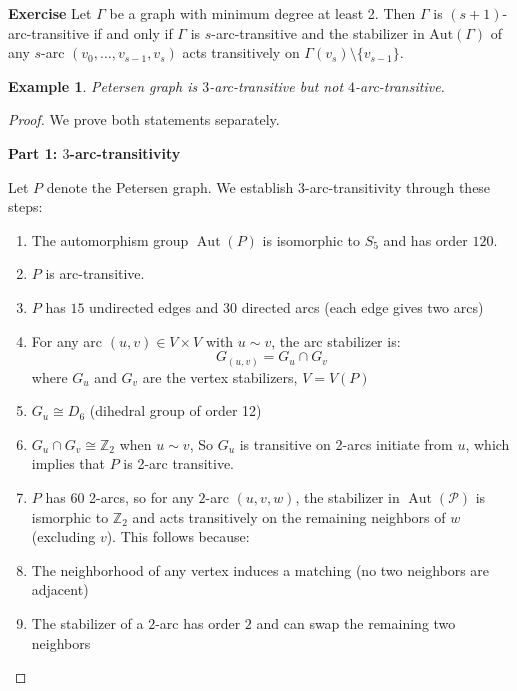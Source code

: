 \documentclass[12pt,a4paper,openany]{book}
\newtheorem{example}{Example}[section]
\begin{document}
\bigskip\noindent\textbf{Exercise}
    Let $\Gamma$ be a graph with minimum degree at least 2. Then $\Gamma$ is $(s + 1)$-arc-transitive if and only if $\Gamma$ is $s$-arc-transitive and the stabilizer in $\text{Aut}(\Gamma)$ of any $s$-arc $(v_0, \dots, v_{s-1}, v_s)$ acts transitively on $\Gamma(v_s) \setminus \{v_{s-1}\}$.


\begin{example}
    Petersen graph is $3$-arc-transitive but not $4$-arc-transitive.
\end{example}


\begin{proof}
We prove both statements separately.

\medskip

\textbf{Part 1: $3$-arc-transitivity}

Let $P$ denote the Petersen graph. We establish $3$-arc-transitivity through these steps:

\begin{enumerate}
    \item The automorphism group $\operatorname{Aut}(P)$ is isomorphic to $S_5$ and has order $120$.

    \item $P$ is arc-transitive.
    
    \item $P$ has $15$ undirected edges and $30$ directed arcs (each edge gives two arcs)
    \item For any arc $(u,v) \in V \times V$ with $u \sim v$, the arc stabilizer is:
\[ G_{(u,v)} = G_u \cap G_v \] where $G_u$ and $G_v$ are the vertex stabilizers, $V=V(P)$

\item $G_u \cong D_6$ (dihedral group of order 12)
        
        \item $G_u \cap G_v \cong \mathbb{Z}_2$ when $u \sim v$, So $G_u$ is transitive on 2-arcs initiate from $u$, which implies that $P$ is 2-arc transitive.
        \item $P$ has 60 2-arcs, so  for any $2$-arc $(u,v,w)$, the stabilizer in $\operatorname{Aut}(\mathcal{P})$ is ismorphic to $\mathbb{Z}_2$ and  acts transitively on the remaining neighbors of $w$ (excluding $v$). This follows because:
    
        \item The neighborhood of any vertex induces a matching (no two neighbors are adjacent)
        \item The stabilizer of a $2$-arc has order $2$ and can swap the remaining two neighbors
    

\end{enumerate}
\end{proof}
\end{document}
